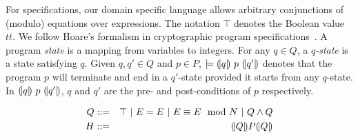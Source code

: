 For specifications, our domain specific language allows arbitrary
conjunctions of (modulo) equations over expressions. The notation
$\top$ denotes the Boolean value $\mathit{tt}$. We follow Hoare's
formalism in cryptographic program specifications~\cite{H:69:ABCP}. A program
\textit{state} is a mapping from variables to integers. For any $q \in
Q$, a \emph{$q$-state} is a state satisfying $q$.
Given $q, q' \in Q$ and $p \in P$, $\models {(\!|}{q}{|\!)}~{p}~{(\!|}{q'}{|\!)}$
denotes that the program $p$ will terminate and end in a $q'$-state
provided it starts from any $q$-state. In ${(\!|}{q}{|\!)}~{p}~{(\!|}{q'}{|\!)}$,
$q$ and $q'$ are the pre- and post-conditions of $p$ respectively.

\begin{eqnarray*}
  Q & ::= & \top
     \ |\   E = E
     \ |\   E \equiv E \mod N
     \ |\   Q \wedge Q\\
  H & ::= & {(\!|}{Q}{|\!)} P {(\!|}{Q}{|\!)}
\end{eqnarray*}


